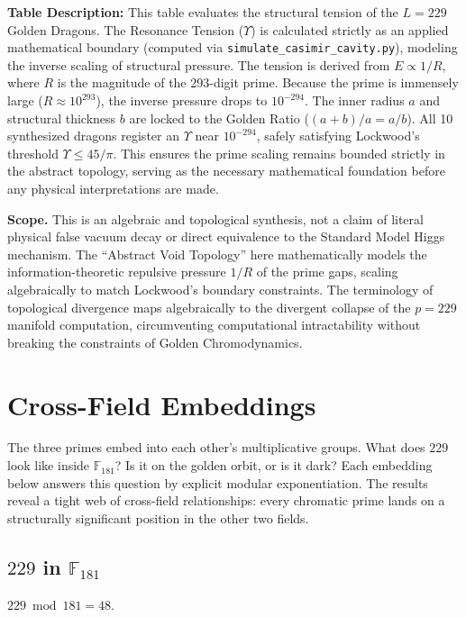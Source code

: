 \textbf{Table Description:} This table evaluates the structural tension of the $L=229$ Golden Dragons. The Resonance Tension ($\Upsilon$) is calculated strictly as an applied mathematical boundary (computed via \texttt{simulate\_casimir\_cavity.py}), modeling the inverse scaling of structural pressure. The tension is derived from $E \propto 1/R$, where $R$ is the magnitude of the 293-digit prime. Because the prime is immensely large ($R \approx 10^{293}$), the inverse pressure drops to $10^{-294}$. The inner radius $a$ and structural thickness $b$ are locked to the Golden Ratio ($(a+b)/a = a/b$). All 10 synthesized dragons register an $\Upsilon$ near $10^{-294}$, safely satisfying Lockwood's threshold $\Upsilon \le 45/\pi$. This ensures the prime scaling remains bounded strictly in the abstract topology, serving as the necessary mathematical foundation before any physical interpretations are made.

\textbf{Scope.} This is an algebraic and topological synthesis, not a claim of literal physical false vacuum decay or direct equivalence to the Standard Model Higgs mechanism. The ``Abstract Void Topology'' here mathematically models the information-theoretic repulsive pressure $1/R$ of the prime gaps, scaling algebraically to match Lockwood's boundary constraints. The terminology of topological divergence maps algebraically to the divergent collapse of the $p=229$ manifold computation, circumventing computational intractability without breaking the constraints of Golden Chromodynamics.

\section{Cross-Field Embeddings}
\label{sec:crossfield}

The three primes embed into each other's multiplicative groups. What does $229$ look like inside $\mathbb{F}_{181}$? Is it on the golden orbit, or is it dark? Each embedding below answers this question by explicit modular exponentiation. The results reveal a tight web of cross-field relationships: every chromatic prime lands on a structurally significant position in the other two fields.

\subsection{$229$ in $\mathbb{F}_{181}$}

$229 \bmod 181 = 48$.

